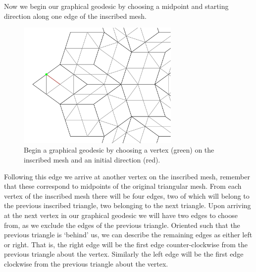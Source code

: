 \documentclass[
  oneside,
  11pt, a4paper,
  footinclude=true,
  headinclude=true,
  cleardoublepage=empty
]{scrbook}
\begin{document}
Now we begin our graphical geodesic by choosing a midpoint and starting direction along one edge of the inscribed mesh. 
\begin{figure}[H]
\centering
\includegraphics[width=0.7\textwidth]{FirstStep}
\caption[First Step of Geodesic]{Begin a graphical geodesic by choosing a vertex (green) on the inscribed mesh and an initial direction (red).}
\label{fig:startstep}
\end{figure}
Following this edge we arrive at another vertex on the inscribed mesh, remember that these correspond to midpoints of the original triangular mesh. From each vertex of the inscribed mesh there will be four edges, two of which will belong to the previous inscribed triangle, two belonging to the next triangle. Upon arriving at the next vertex in our graphical geodesic we will have two edges to choose from, as we exclude the edges of the previous triangle. Oriented such that the previous triangle is `behind' us, we can describe the remaining edges as either left or right. That is, the right edge will be the first edge counter-clockwise from the previous triangle about the vertex. Similarly the left edge will be the first edge clockwise from the previous triangle about the vertex.
\end{document}
